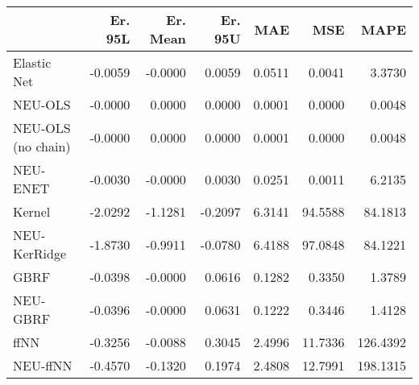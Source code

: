 \begin{tabular}{lrrrrrr}
\toprule
{} &  Er. 95L &  Er. Mean &  Er. 95U &    MAE &     MSE &     MAPE \\
\midrule
Elastic Net        &  -0.0059 &   -0.0000 &   0.0059 & 0.0511 &  0.0041 &   3.3730 \\
NEU-OLS            &  -0.0000 &    0.0000 &   0.0000 & 0.0001 &  0.0000 &   0.0048 \\
NEU-OLS (no chain) &  -0.0000 &    0.0000 &   0.0000 & 0.0001 &  0.0000 &   0.0048 \\
NEU-ENET           &  -0.0030 &   -0.0000 &   0.0030 & 0.0251 &  0.0011 &   6.2135 \\
Kernel             &  -2.0292 &   -1.1281 &  -0.2097 & 6.3141 & 94.5588 &  84.1813 \\
NEU-KerRidge       &  -1.8730 &   -0.9911 &  -0.0780 & 6.4188 & 97.0848 &  84.1221 \\
GBRF               &  -0.0398 &   -0.0000 &   0.0616 & 0.1282 &  0.3350 &   1.3789 \\
NEU-GBRF           &  -0.0396 &   -0.0000 &   0.0631 & 0.1222 &  0.3446 &   1.4128 \\
ffNN               &  -0.3256 &   -0.0088 &   0.3045 & 2.4996 & 11.7336 & 126.4392 \\
NEU-ffNN           &  -0.4570 &   -0.1320 &   0.1974 & 2.4808 & 12.7991 & 198.1315 \\
\bottomrule
\end{tabular}
